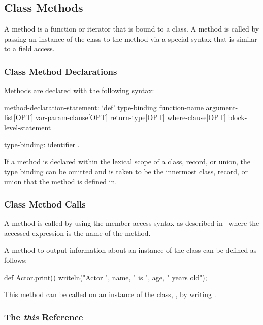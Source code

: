 \subsection{Class Methods}
\label{Class_Methods}

A method is a function or iterator that is bound to a class.  A method
is called by passing an instance of the class to the method via a
special syntax that is similar to a field access.

\subsubsection{Class Method Declarations}
\label{Class_Method_Declarations}

Methods are declared with the following syntax:
\begin{syntax}
method-declaration-statement:
  `def' type-binding function-name argument-list[OPT] var-param-clause[OPT]
    return-type[OPT] where-clause[OPT] block-level-statement

type-binding:
  identifier .
\end{syntax}
If a method is declared within the lexical scope of a class, record,
or union, the type binding can be omitted and is taken to be the
innermost class, record, or union that the method is defined in.

\subsubsection{Class Method Calls}
\label{Class_Method_Calls}

A method is called by using the member access syntax as described
in~ where the accessed expression is
the name of the method.

\begin{example}
A method to output information about an instance of the 
class can be defined as follows:
\begin{chapel}
def Actor.print() {
  writeln("Actor ", name, " is ", age, " years old");
}
\end{chapel}
This method can be called on an instance of the 
class, , by writing .
\end{example}

\subsubsection{The {\em this} Reference}
\label{The_em_this_Reference}

